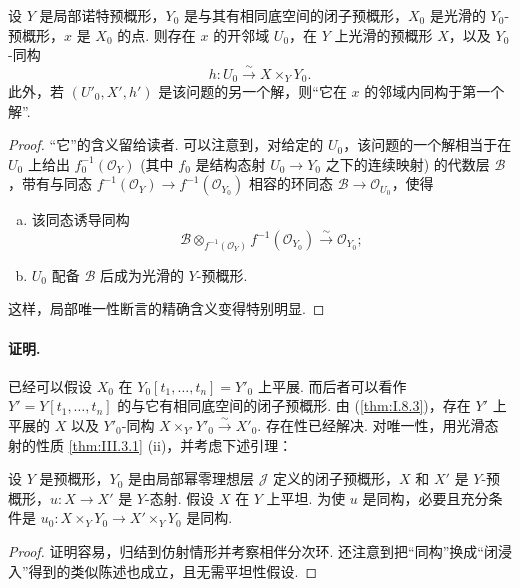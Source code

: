 \begin{theorem}\label{thm:III.4.1}
设 $Y$ 是局部诺特预概形，$Y_0$ 是与其有相同底空间的闭子预概形，$X_0$ 是光滑的 $Y_0$-预概形，$x$ 是 $X_0$ 的点. 则存在 $x$ 的开邻域 $U_0$，在 $Y$ 上光滑的预概形 $X$，以及 $Y_0$-同构
\[
h \colon U_0 \stackrel{\sim}{\longrightarrow} X \times_Y Y_0.
\]
此外，若 $(U'_0, X', h')$ 是该问题的另一个解，则``它在 $x$ 的邻域内同构于第一个解''.
\end{theorem}

\begin{proof}
``它''的含义留给读者. 可以注意到，对给定的 $U_0$，该问题的一个解相当于在 $U_0$ 上给出 $f_0^{-1}(\mathcal{O}_Y)$ (其中 $f_0$ 是结构态射 $U_0 \to Y_0$ 之下的连续映射) 的代数层 $\mathcal{B}$，带有与同态 $f^{-1}(\mathcal{O}_Y) \to f^{-1}(\mathcal{O}_{Y_0})$ 相容的环同态 $\mathcal{B} \to \mathcal{O}_{U_0}$，使得
\begin{enumerate}[a)]
\item 该同态诱导同构
\[
\mathcal{B} \otimes_{f^{-1}(\mathcal{O}_Y)} f^{-1}(\mathcal{O}_{Y_0}) \stackrel{\sim}{\longrightarrow} \mathcal{O}_{Y_0};
\]
\item $U_0$ 配备 $\mathcal{B}$ 后成为光滑的 $Y$-预概形.
\end{enumerate}
这样，局部唯一性断言的精确含义变得特别明显.
\end{proof}

\paragraph*{证明.} 已经可以假设 $X_0$ 在 $Y_0[t_1, \dots, t_n] = Y'_0$ 上平展. 而后者可以看作 $Y' = Y[t_1, \dots, t_n]$ 的与它有相同底空间的闭子预概形. 由 (\ref{thm:I.8.3})，存在 $Y'$ 上平展的 $X$ 以及 $Y'_0$-同构 $X \times_{Y'} Y'_0 \stackrel{\sim}{\longrightarrow} X'_0$. 存在性已经解决. 对唯一性，用光滑态射的性质 \ref{thm:III.3.1} (ii)，并考虑下述引理：

\begin{lemma}\label{lem:III.4.2}
设 $Y$ 是预概形，$Y_0$ 是由局部幂零理想层 $\mathcal{J}$ 定义的闭子预概形，$X$ 和 $X'$ 是 $Y$-预概形，$u \colon X \to X'$ 是 $Y$-态射. 假设 $X$ 在 $Y$ 上平坦. 为使 $u$ 是同构，必要且充分条件是 $u_0 \colon X \times_Y Y_0 \to X' \times_Y Y_0$ 是同构.
\end{lemma}

\begin{proof}
证明容易，归结到仿射情形并考察相伴分次环. 还注意到把``同构''换成``闭浸入''得到的类似陈述也成立，且无需平坦性假设.
\end{proof}

